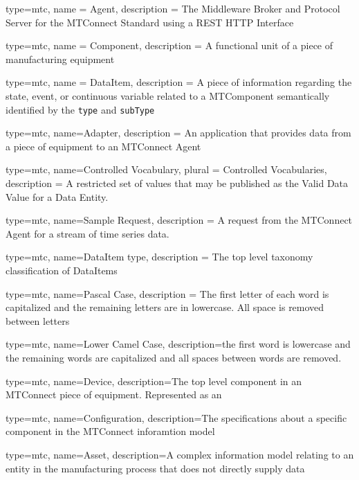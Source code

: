 
{
  type=mtc,
  name = {Agent},
  description = {The Middleware Broker and Protocol Server for the MTConnect Standard using a REST HTTP Interface}
}

{
  type=mtc,
  name = Component,
  description = {A functional unit of a piece of manufacturing equipment}
}

{
  type=mtc,
  name = DataItem,
  description = {A piece of information regarding the state, event, or continuous variable related to a \gls{MTComponent} semantically identified by the \texttt{type} and \texttt{subType}}
}

{
  type=mtc,
  name=Adapter,
  description = {An application that provides data from a piece of equipment to an MTConnect Agent}
}

{
  type=mtc,
  name={Controlled Vocabulary},
  plural = {Controlled Vocabularies},
  description = {A restricted set of values that may be published as the Valid Data Value for a Data Entity.}
}

{
  type=mtc,
  name={Sample Request},
  description = {A request from the MTConnect \gls{Agent} for a stream of time series data.}
}

{
  type=mtc,
  name={DataItem type},
  description = {The top level taxonomy classification of \glspl{DataItem}}
}

{
  type=mtc,
  name={Pascal Case},
  description = {The first letter of each word is capitalized and the remaining letters are in lowercase. All space is removed between letters}
}

{
  type=mtc,
  name={Lower Camel Case},
  description={the first word is lowercase and the remaining words are capitalized and all spaces between words are removed.}
}


{
  type=mtc,
  name=Device,
  description={The top level component in an MTConnect piece of equipment. Represented as an }
}

{
  type=mtc,
  name=Configuration,
  description={The specifications about a specific component in the MTConnect inforamtion model}
}

{
  type=mtc,
  name=Asset,
  description={A complex information model relating to an entity in the manufacturing process that does not directly supply data}
}

